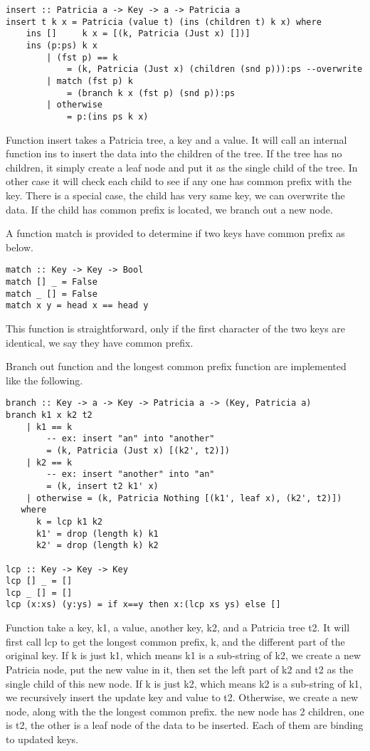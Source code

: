 \documentclass{article}
\begin{document}
\lstset{language=Haskell}
\begin{lstlisting}
insert :: Patricia a -> Key -> a -> Patricia a
insert t k x = Patricia (value t) (ins (children t) k x) where
    ins []     k x = [(k, Patricia (Just x) [])]
    ins (p:ps) k x
        | (fst p) == k
            = (k, Patricia (Just x) (children (snd p))):ps --overwrite
        | match (fst p) k
            = (branch k x (fst p) (snd p)):ps
        | otherwise
            = p:(ins ps k x)

\end{lstlisting}

Function insert takes a Patricia tree, a key and a value. It will call
an internal function ins to insert the data into the children of the tree.
If the tree has no children, it simply create a leaf node and put it
as the single child of the tree. In other case it will check each child
to see if any one has common prefix with the key. There is a special case,
the child has very same key, we can overwrite the data. If the child has common
prefix is located, we branch out a new node.

A function match is provided to determine if two keys have common prefix as
below.

\begin{lstlisting}
match :: Key -> Key -> Bool
match [] _ = False
match _ [] = False
match x y = head x == head y
\end{lstlisting}

This function is straightforward, only if the first character of the two keys
are identical, we say they have common prefix.

Branch out function and the longest common prefix function are implemented like
the following.

\begin{lstlisting}
branch :: Key -> a -> Key -> Patricia a -> (Key, Patricia a)
branch k1 x k2 t2
    | k1 == k
        -- ex: insert "an" into "another"
        = (k, Patricia (Just x) [(k2', t2)])
    | k2 == k
        -- ex: insert "another" into "an"
        = (k, insert t2 k1' x)
    | otherwise = (k, Patricia Nothing [(k1', leaf x), (k2', t2)])
   where
      k = lcp k1 k2
      k1' = drop (length k) k1
      k2' = drop (length k) k2

lcp :: Key -> Key -> Key
lcp [] _ = []
lcp _ [] = []
lcp (x:xs) (y:ys) = if x==y then x:(lcp xs ys) else []
\end{lstlisting}

Function take a key, k1, a value, another key, k2, and a Patricia tree t2. It will first
call lcp to get the longest common prefix, k, and the different part of the original key.
If k is just k1, which means k1 is a sub-string of k2, we create a new Patricia node,
put the new value in it, then set the left part of k2 and t2 as the single child of this
new node. If k is just k2, which means k2 is a sub-string of k1, we recursively insert
the update key and value to t2. Otherwise, we create a new node, along with the the longest
common prefix. the new node has 2 children, one is t2, the other is a leaf node of the data
to be inserted. Each of them are binding to updated keys.
\end{document}

